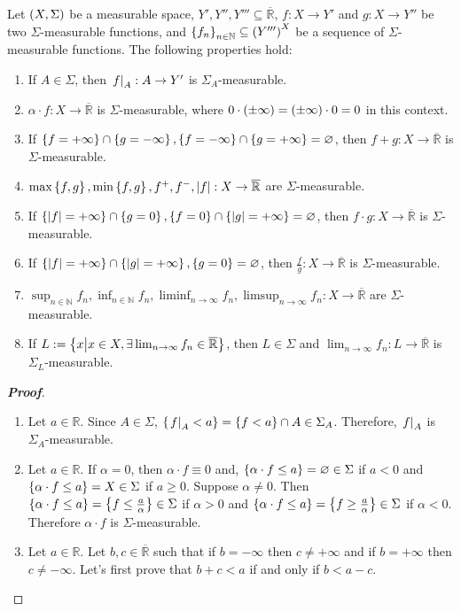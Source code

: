 \begin{proposition}
  Let $\left(X,\Sigma\right)$ be a measurable space, $Y',Y'',Y'''\subseteq\overline{\mathbb{R}}$, $f:X\rightarrow Y'$ and $g:X\rightarrow Y''$ be two $\Sigma$-measurable functions, and $\left\{f_n\right\}_{n\in\mathbb{N}}\subseteq\left(Y'''\right)^X$ be a sequence of $\Sigma$-measurable functions. The following properties hold: %

  \begin{enumerate}
    \item If $A\in\Sigma$, then $\left.f\right|_{A}:A\rightarrow Y'$ is $\Sigma_A$-measurable.
    \item $\alpha\cdot f:X\rightarrow\overline{\mathbb{R}}$ is $\Sigma$-measurable, where $0\cdot\left(\pm\infty\right)=\left(\pm\infty\right)\cdot 0=0$ in this context.
    \item If $\left\{f=+\infty\right\}\cap\left\{g=-\infty\right\},\left\{f=-\infty\right\}\cap\left\{g=+\infty\right\}=\varnothing$, then $f+g:X\rightarrow\overline{\mathbb{R}}$ is $\Sigma$-measurable.
    \item $\max\left\{f,g\right\}, \min\left\{f,g\right\}, f^+, f^-, \left|f\right|:X\rightarrow\overline{\mathbb{R}}$ are $\Sigma$-measurable.
    \item If $\left\{\left|f\right|=+\infty\right\}\cap\left\{g=0\right\},\left\{f=0\right\}\cap\left\{\left|g\right|=+\infty\right\}=\varnothing$, then $f\cdot g:X\rightarrow\overline{\mathbb{R}}$ is $\Sigma$-measurable.
    \item If $\left\{\left|f\right|=+\infty\right\}\cap\left\{\left|g\right|=+\infty\right\},\left\{g=0\right\}=\varnothing$, then $\frac{f}{g}:X\rightarrow\overline{\mathbb{R}}$ is $\Sigma$-measurable.
    \item $\sup_{n\in\mathbb{N}}{f_n}, \inf_{n\in\mathbb{N}}{f_n}, \liminf_{n\to\infty}{f_n}, \limsup_{n\to\infty}{f_n}:X\rightarrow\overline{\mathbb{R}}$ are $\Sigma$-measurable.
    \item If $L:=\left\{x\middle|x\in X,\exists\lim_{n\to\infty}{f_n}\in\overline{\mathbb{R}}\right\}$, then $L\in\Sigma$ and $\lim_{n\to\infty}{f_n}:L\rightarrow\overline{\mathbb{R}}$ is $\Sigma_L$-measurable.
  \end{enumerate}
  \begin{proof}[\rm\textbf{Proof}]
    \hfill
    \begin{enumerate}
      \item Let $a\in\mathbb{R}$. Since $A\in\Sigma$,  $\left\{\left.f\right|_{A}<a\right\}=\left\{f<a\right\}\cap A\in\Sigma_A$. Therefore, $\left.f\right|_{A}$ is $\Sigma_A$-measurable.
      \item Let $a\in\mathbb{R}$. If $\alpha=0$, then $\alpha\cdot f\equiv 0$ and, $\left\{\alpha\cdot f\leq a\right\}=\varnothing\in\Sigma$ if $a<0$ and $\left\{\alpha\cdot f\leq a\right\}=X\in\Sigma$ if $a\geq 0$. Suppose $\alpha\neq 0$. Then $\left\{\alpha\cdot f\leq a\right\}=\left\{f\leq\frac{a}{\alpha}\right\}\in\Sigma$ if $\alpha>0$ and $\left\{\alpha\cdot f\leq a\right\}=\left\{f\geq\frac{a}{\alpha}\right\}\in\Sigma$ if $\alpha<0$. Therefore $\alpha\cdot f$ is $\Sigma$-measurable.
      \item Let $a\in\mathbb{R}$. Let $b,c\in\overline{\mathbb{R}}$ such that if $b=-\infty$ then $c\neq+\infty$ and if $b=+\infty$ then $c\neq-\infty$. Let's first prove that $b+c<a$ if and only if $b<a-c$. 
      

\end{enumerate}
\end{proof}
\end{proposition}

